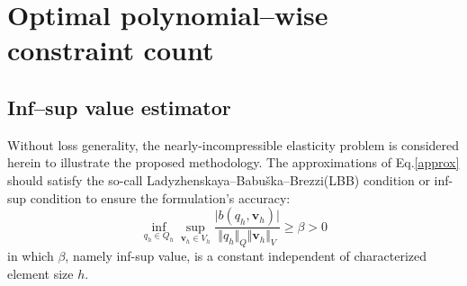 \section{Optimal polynomial--wise constraint count}
\subsection{Inf--sup value estimator}
Without loss generality, the nearly-incompressible elasticity problem is considered herein to illustrate the proposed methodology.
The approximations of Eq.\eqref{approx} should satisfy the so-call Ladyzhenskaya–Babuška–Brezzi(LBB) condition or inf-sup condition \cite{bathe1996} to ensure the formulation's accuracy:
\begin{equation}\label{infsup}
    \inf_{q_h \in Q_h} \sup_{\boldsymbol v_h \in V_h} \frac{\vert b(q_h,\boldsymbol v_h) \vert}{\Vert q_h \Vert_Q \Vert \boldsymbol v_h \Vert_V} \ge \beta > 0
\end{equation}
in which $\beta$, namely inf-sup value, is a constant independent of characterized element size $h$.

